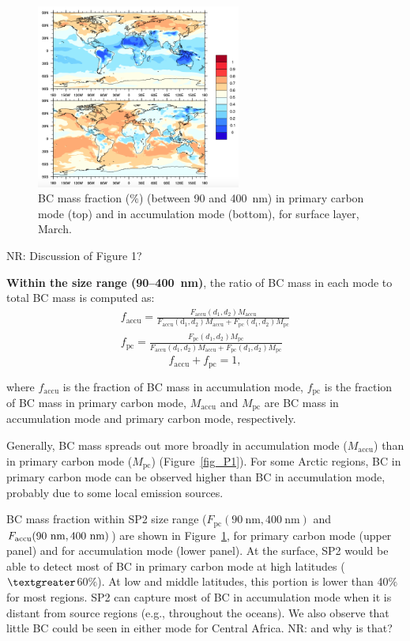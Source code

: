 \documentclass[11pt]{article}
\newcommand{\nrtodo}[1]{{\color{blue} NR: #1}}
\begin{document}
\begin{figure}[!h] 
	\begin{center}
		\includegraphics[width = 0.6\textwidth]{Rplot02}
		\caption[]{\label{fig_P2} BC mass fraction ($\%$) (between 90 and 400~nm) in primary carbon mode (top) and in accumulation mode (bottom), for surface layer, March.}
	\end{center}
\end{figure}

\nrtodo{Discussion of Figure 1?}

\noindent \textbf{Within the size range (90--400~nm)}, the ratio of BC mass in each mode to total BC mass is computed as:
\begin{align*}
f_{\text{accu}} = \frac{F_{\text{accu}}(d_{1}, d_{2})M_{\text{accu}}}{F_{\text{accu}}(\text{d}_{1}, d_{2})M_{\text{accu}}+F_{\text{pc}}(d_{1}, d_{2})M_{\text{pc}}}\\
f_{\text{pc}} = \frac{F_{\text{pc}}(d_{1}, d_{2})M_{\text{pc}}}{F_{\text{accu}}(d_{1}, d_{2})M_{\text{accu}}+F_{\text{pc}}(d_{1}, d_{2})M_{\text{pc}}}
\end{align*}
\[f_{\text{accu}} + f_{\text{pc}} = 1,\]

\noindent where $f_{\text{accu}}$ is the fraction of BC mass in
accumulation mode, $f_{\text{pc}}$ is the fraction of BC mass in
primary carbon mode, $M_{\text{accu}}$ and $M_{\text{pc}}$ are BC mass
in accumulation mode and primary carbon mode, respectively.

\noindent Generally, BC mass spreads out more broadly in accumulation mode ($M_{\text{accu}}$) than in primary carbon mode ($M_{\text{pc}}$) (Figure~\ref{fig_P1}). For some Arctic regions, BC in primary carbon mode can be observed higher than BC in accumulation mode, probably due to some local emission sources.

\noindent BC mass fraction within SP2 size range ($F_{\text{pc}}(90~\text{nm}, 400~\text{nm})$ and
$F_{\text{accu}}(90~\rm nm, 400~\rm nm)$) are shown in Figure~\ref{fig_P2}, for primary carbon mode
(upper panel) and for accumulation mode (lower panel). At the surface,
SP2 would be able to detect most of BC in primary
carbon mode at high latitudes ($\textgreater$60$\%$).  At low and
middle latitudes, this portion is lower than 40$\%$ for most
regions. SP2 can capture most of BC in accumulation mode when it is
distant from source regions (e.g., throughout the oceans). We also
observe that little BC could be seen in either mode for Central
Africa. \nrtodo{and why is that?} 
\end{document}
